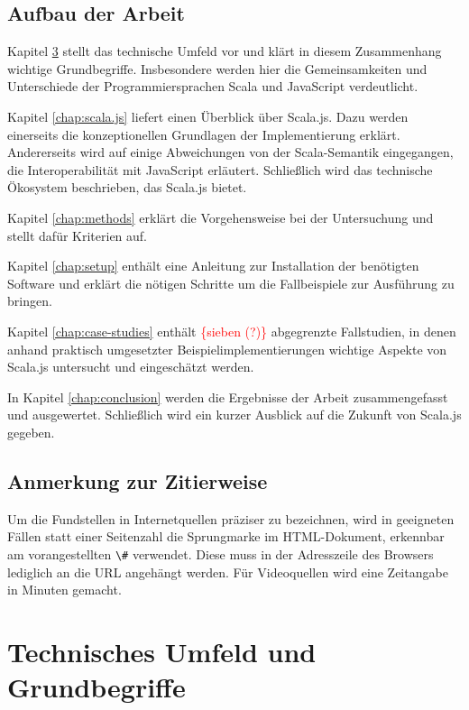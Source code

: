 \documentclass[a4paper, 12pt, hidelinks, listof=totoc, listoftables=totoc, bibliography=totoc]{scrreprt}
\newcommand{\code}[1]{\lstinline[language=Scala, style=inline]|#1|}
\newcommand{\TODOi}[1]{\textcolor{red}{\{#1\}}}
\begin{document}
\section{Aufbau der Arbeit}

Kapitel \ref{chap:basics} stellt das technische Umfeld vor und klärt in diesem Zusammenhang wichtige Grundbegriffe. Insbesondere werden hier die Gemeinsamkeiten und Unterschiede der Programmiersprachen Scala und JavaScript verdeutlicht.

Kapitel \ref{chap:scala.js} liefert einen Überblick über Scala.js. Dazu werden einerseits die konzeptionellen Grundlagen der Implementierung erklärt. Andererseits wird auf einige Abweichungen von der Scala-Semantik eingegangen, die Interoperabilität mit JavaScript erläutert. Schließlich wird das technische Ökosystem beschrieben, das Scala.js bietet.

Kapitel \ref{chap:methods} erklärt die Vorgehensweise bei der Untersuchung und stellt dafür Kriterien auf.

Kapitel \ref{chap:setup} enthält eine Anleitung zur Installation der benötigten Software und erklärt die nötigen Schritte um die Fallbeispiele zur Ausführung zu bringen.

Kapitel \ref{chap:case-studies} enthält \TODOi{sieben (?)} abgegrenzte Fallstudien, in denen anhand praktisch umgesetzter Beispielimplementierungen wichtige Aspekte von Scala.js untersucht und eingeschätzt werden.

In Kapitel \ref{chap:conclusion} werden die Ergebnisse der Arbeit zusammengefasst und ausgewertet. Schließlich wird ein kurzer Ausblick auf die Zukunft von Scala.js gegeben.


\section{Anmerkung zur Zitierweise}

Um die Fundstellen in Internetquellen präziser zu bezeichnen, wird in geeigneten Fällen statt einer Seitenzahl die Sprungmarke im HTML-Dokument, erkennbar am vorangestellten \code{\#} verwendet. Diese muss in der Adresszeile des Browsers lediglich an die URL angehängt werden. Für Videoquellen wird eine Zeitangabe in Minuten gemacht.


\chapter{Technisches Umfeld und Grundbegriffe}\label{chap:basics}
\end{document}
